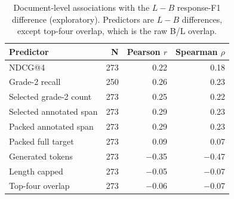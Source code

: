 \begin{table}[htbp]\centering\small
\caption{Document-level associations with the $L-B$ response-F1 difference (exploratory). Predictors are $L-B$ differences, except top-four overlap, which is the raw B/L overlap.}\label{tab:associations}
\begin{tabular}{lrrr}\toprule
Predictor & N & Pearson $r$ & Spearman $\rho$\\\midrule
NDCG@4 & 273 & 0.22 & 0.18\\
Grade-2 recall & 250 & 0.26 & 0.23\\
Selected grade-2 count & 273 & 0.25 & 0.22\\
Selected annotated span & 273 & 0.29 & 0.23\\
Packed annotated span & 273 & 0.29 & 0.23\\
Packed full target & 273 & 0.09 & 0.07\\
Generated tokens & 273 & $-$0.35 & $-$0.47\\
Length capped & 273 & $-$0.05 & $-$0.07\\
Top-four overlap & 273 & $-$0.06 & $-$0.07\\
\bottomrule\end{tabular}\end{table}
